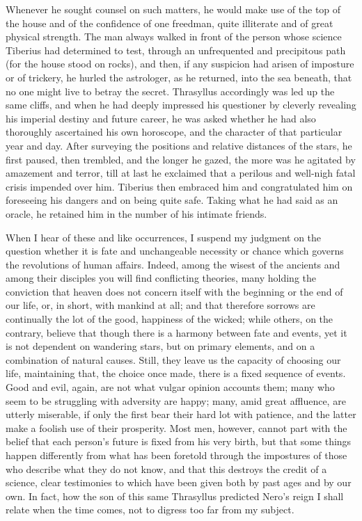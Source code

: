 
Whenever he sought counsel on such matters, he would make use of the top of the house and of the confidence of one freedman, quite illiterate and of great physical strength. The man always walked in front of the person whose science Tiberius had determined to test, through an unfrequented and precipitous path (for the house stood on rocks), and then, if any suspicion had arisen of imposture or of trickery, he hurled the astrologer, as he returned, into the sea beneath, that no one might live to betray the secret. Thrasyllus accordingly was led up the same cliffs, and when he had deeply impressed his questioner by cleverly revealing his imperial destiny and future career, he was asked whether he had also thoroughly ascertained his own horoscope, and the character of that particular year and day. After surveying the positions and relative distances of the stars, he first paused, then trembled, and the longer he gazed, the more was he agitated by amazement and terror, till at last he exclaimed that a perilous and well-nigh fatal crisis impended over him. Tiberius then embraced him and congratulated him on foreseeing his dangers and on being quite safe. Taking what he had said as an oracle, he retained him in the number of his intimate friends.


When I hear of these and like occurrences, I suspend my judgment on the question whether it is fate and unchangeable necessity or chance which governs the revolutions of human affairs. Indeed, among the wisest of the ancients and among their disciples you will find conflicting theories, many holding the conviction that heaven does not concern itself with the beginning or the end of our life, or, in short, with mankind at all; and that therefore sorrows are continually the lot of the good, happiness of the wicked; while others, on the contrary, believe that though there is a harmony between fate and events, yet it is not dependent on wandering stars, but on primary elements, and on a combination of natural causes. Still, they leave us the capacity of choosing our life, maintaining that, the choice once made, there is a fixed sequence of events. Good and evil, again, are not what vulgar opinion accounts them; many who seem to be struggling with adversity are happy; many, amid great affluence, are utterly miserable, if only the first bear their hard lot with patience, and the latter make a foolish use of their prosperity. Most men, however, cannot part with the belief that each person's future is fixed from his very birth, but that some things happen differently from what has been foretold through the impostures of those who describe what they do not know, and that this destroys the credit of a science, clear testimonies to which have been given both by past ages and by our own. In fact, how the son of this same Thrasyllus predicted Nero's reign I shall relate when the time comes, not to digress too far from my subject.

